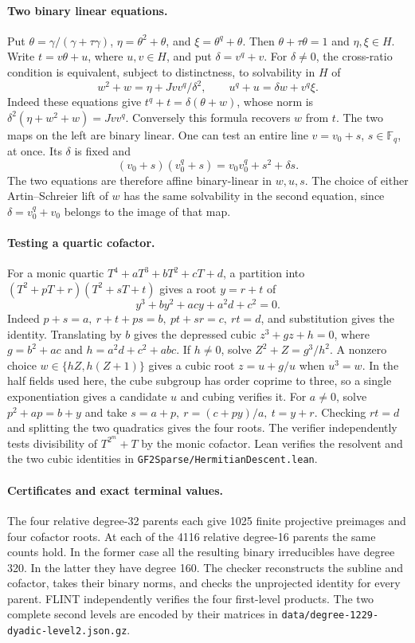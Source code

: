 \documentclass[11pt]{article}
\begin{document}
\paragraph{Two binary linear equations.}
Put \(\theta=\gamma/(\gamma+\tau\gamma)\),
\(\eta=\theta^2+\theta\), and \(\xi=\theta^q+\theta\).
Then \(\theta+\tau\theta=1\) and \(\eta,\xi\in H\).
Write \(t=v\theta+u\), where \(u,v\in H\), and put
\(\delta=v^q+v\). For \(\delta\ne0\), the cross-ratio condition is
equivalent, subject to distinctness, to solvability in \(H\) of
\[
 w^2+w=\eta+Jvv^q/\delta^2,\qquad
 u^q+u=\delta w+v^q\xi .
\]
Indeed these equations give \(t^q+t=\delta(\theta+w)\), whose norm
is \(\delta^2(\eta+w^2+w)=Jvv^q\). Conversely this formula recovers
\(w\) from \(t\). The two maps on the left are binary linear.
One can test an entire line \(v=v_0+s\), \(s\in\mathbb F_q\),
at once. Its \(\delta\) is fixed and
\[
   (v_0+s)(v_0^q+s)=v_0v_0^q+s^2+\delta s .
\]
The two equations are therefore affine binary-linear in \(w,u,s\).
The choice of either Artin--Schreier lift of \(w\) has the same
solvability in the second equation, since \(\delta=v_0^q+v_0\)
belongs to the image of that map.

\paragraph{Testing a quartic cofactor.}
For a monic quartic \(T^4+aT^3+bT^2+cT+d\), a partition into
\((T^2+pT+r)(T^2+sT+t)\) gives a root \(y=r+t\) of
\[
  y^3+by^2+acy+a^2d+c^2=0.
\]
Indeed \(p+s=a,\ r+t+ps=b,\ pt+sr=c,\ rt=d\), and substitution
gives the identity. Translating by \(b\) gives the depressed cubic
\(z^3+gz+h=0\), where \(g=b^2+ac\) and \(h=a^2d+c^2+abc\).
If \(h\ne0\), solve \(Z^2+Z=g^3/h^2\). A nonzero choice
\(w\in\{hZ,h(Z+1)\}\) gives a cubic root \(z=u+g/u\)
when \(u^3=w\). In the half fields used here, the cube subgroup
has order coprime to three, so a single exponentiation gives a
candidate \(u\) and cubing verifies it.
For \(a\ne0\), solve \(p^2+ap=b+y\) and take
\(s=a+p,\ r=(c+py)/a,\ t=y+r\). Checking \(rt=d\) and splitting
the two quadratics gives the four roots. The verifier independently
tests divisibility of \(T^{2^m}+T\) by the monic cofactor.
Lean verifies the resolvent and the two cubic identities in
\nolinkurl{GF2Sparse/HermitianDescent.lean}.

\paragraph{Certificates and exact terminal values.}
The four relative degree-32 parents each give 1025 finite projective
preimages and four cofactor roots. At each of the 4116 relative
degree-16 parents the same counts hold. In the former case all the
resulting binary irreducibles have degree 320. In the latter they
have degree 160. The checker reconstructs the subline and cofactor,
takes their binary norms, and checks the unprojected identity for
every parent. FLINT independently verifies the four first-level
products. The two complete second levels are encoded by their matrices
in \nolinkurl{data/degree-1229-dyadic-level2.json.gz}.
\end{document}
